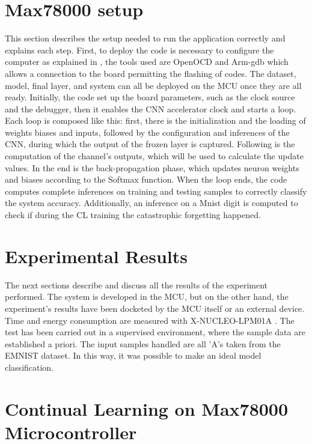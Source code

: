 \section{Max78000 setup}
\label{sec:application_setup}

\quad This section describes the setup needed to run the application correctly and explains each step. First, to deploy the code is necessary to configure the computer as explained in \cite{SDK}, the tools used are OpenOCD and Arm-gdb which allows a connection to the board permitting the flashing of codes. The dataset, model, final layer, and system can all be deployed on the MCU once they are all ready.  Initially, the code set up the board parameters, such as the clock source and the debugger, then it enables the CNN accelerator clock and starts a loop. Each loop is composed like this: first, there is the initialization and the loading of weights biases and inputs, followed by the configuration and inferences of the CNN, during which the output of the frozen layer is captured. Following is the computation of the channel's outputs, which will be used to calculate the update values. In the end is the back-propagation phase, which updates neuron weights and biases according to the Softmax function. When the loop ends, the code computes complete inferences on training and testing samples to correctly classify the system accuracy. Additionally, an inference on a Mnist digit is computed to check if during the CL training the catastrophic forgetting happened.


\section{Experimental Results}
\label{cha:experimental_results}

\quad The next sections describe and discuss all the results of the experiment performed. The system is developed in the MCU, but on the other hand, the experiment's results have been docketed by the MCU itself or an external device. Time and energy consumption are measured with X-NUCLEO-LPM01A \cite{nucleo}. The test has been carried out in a supervised environment, where the sample data are established a priori. The input samples handled are all 'A's taken from the EMNIST dataset. In this way, it was possible to make an ideal model classification. 

\section{Continual Learning on Max78000 Microcontroller}
\label{sec:image_classification}

